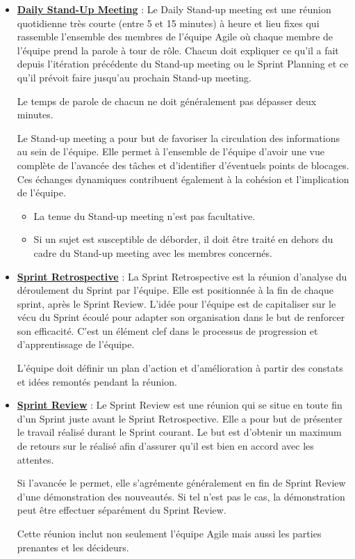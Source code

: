 \begin{itemize}
\item \textbf{\underline{Daily Stand-Up Meeting}} : Le Daily Stand-up meeting est une réunion quotidienne très courte (entre 5 et 15 minutes) à heure et lieu fixes qui rassemble l'ensemble des membres de l'équipe Agile où chaque membre de l'équipe prend la parole à tour de rôle. Chacun doit expliquer ce qu'il a fait depuis l'itération précédente du Stand-up meeting ou le Sprint Planning et ce qu'il prévoit faire jusqu'au prochain Stand-up meeting. 
\begin{beware}[borderline west={5pt}{0pt}{red}, coltitle={red}, title=Remarque : ]
Le temps de parole de chacun ne doit généralement pas dépasser deux minutes.
\end{beware}
Le Stand-up meeting a pour but de favoriser la circulation des informations au sein de l'équipe. Elle permet à l'ensemble de l'équipe d'avoir une vue complète de l'avancée des tâches et d'identifier d'éventuels points de blocages. Ces échanges dynamiques contribuent également à la cohésion et l'implication de l'équipe.
\begin{beware}[borderline west={5pt}{0pt}{red}, coltitle={red}, title=Attention : ]
\begin{itemize}
    \item La tenue du Stand-up meeting n'est pas facultative.
    \item Si un sujet est susceptible de déborder, il doit être traité en dehors du cadre du Stand-up meeting avec les membres concernés.
\end{itemize}
\end{beware}
\item \textbf{\underline{Sprint Retrospective}} : La Sprint Retrospective est la réunion d'analyse du déroulement du Sprint par l'équipe. Elle est positionnée à la fin de chaque sprint, après le Sprint Review. L'idée pour l'équipe est de capitaliser sur le vécu du Sprint écoulé pour adapter son organisation dans le but de renforcer son efficacité. C'est un élément clef dans le processus de progression et d'apprentissage de l'équipe.

L'équipe doit définir un plan d'action et d'amélioration à partir des constats et idées remontés pendant la réunion.

\item \textbf{\underline{Sprint Review}} :
Le Sprint Review est une réunion qui se situe en toute fin d'un Sprint juste avant le Sprint Retrospective.
Elle a pour but de présenter le travail réalisé durant le Sprint courant.
Le but est d'obtenir un maximum de retours sur le réalisé afin d'assurer qu'il est bien en accord avec les attentes.

Si l'avancée le permet, elle s’agrémente généralement en fin de Sprint Review d'une démonstration des nouveautés. 
Si tel n'est pas le cas, la démonstration peut être effectuer séparément du Sprint Review.
\begin{beware}[borderline west={5pt}{0pt}{olive3}, coltitle={olive3}, title=Note : ]
   Cette réunion inclut non seulement l'équipe Agile mais aussi les parties prenantes et les décideurs.
\end{beware}
\end{itemize}


